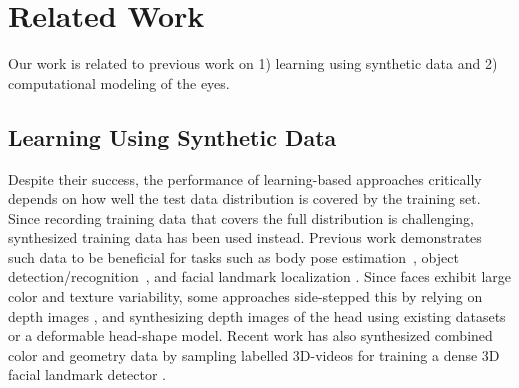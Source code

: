 
\section{Related Work}

Our work is related to previous work on 1) learning using synthetic data and 2) computational modeling of the eyes.

\subsection{Learning Using Synthetic Data}

Despite their success,
the performance of learning-based approaches critically depends on how well the test data distribution is covered by the training set.
Since recording training data that covers the full distribution is challenging,
synthesized training data has been used instead.
Previous work demonstrates such data to be beneficial for tasks such as body pose estimation~\cite{okada2008relevant,shotton2013real}, object detection/recognition~\cite{fu2011neural,yu2010improving,liebelt2010multiview,peng2014exploring}, and facial landmark localization \cite{baltrusaitis20123d,zface}.
%
Since faces exhibit large color and texture variability, some approaches side-stepped this by relying on depth images \cite{baltrusaitis20123d,fanelli2011real}, and synthesizing depth images of the head using existing datasets or a deformable head-shape model.
Recent work has also synthesized combined color and geometry data by sampling labelled 3D-videos for training a dense 3D facial landmark detector \cite{zface}.

